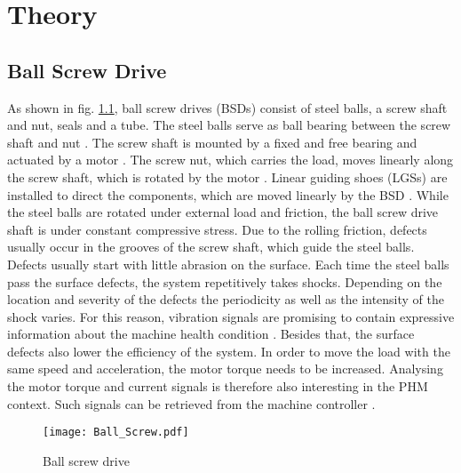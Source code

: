 \chapter{Theory}\label{chapter:theory}

\section{Ball Screw Drive}
As shown in fig. \ref{fig:Ball_Screw}, ball screw drives (BSDs) consist of steel balls, a screw shaft and nut, seals and a tube. The steel balls serve as ball bearing between the screw shaft and nut \cite{Lee2015}. The screw shaft is mounted by a fixed and free bearing and actuated by a motor \cite{DENG2020}. The screw nut, which carries the load, moves linearly along the screw shaft, which is rotated by the motor \cite{Lee2015}. Linear guiding shoes (LGSs) are installed to direct the components, which are moved linearly by the BSD \cite{DENG2020}. While the steel balls are rotated under external load and friction, the ball screw drive shaft is under constant compressive stress. Due to the rolling friction, defects usually occur in the grooves of the screw shaft, which guide the steel balls. Defects usually start with little abrasion on the surface. Each time the steel balls pass the surface defects, the system repetitively takes shocks. Depending on the location and severity of the defects the periodicity as well as the intensity of the shock varies. For this reason, vibration signals are promising to contain expressive information about the machine health condition \cite{Lee2015}. Besides that, the surface defects also lower the efficiency of the system. In order to move the load with the same speed and acceleration, the motor torque needs to be increased. Analysing the motor torque and current signals is therefore also interesting in the PHM context. Such signals can be retrieved from the machine controller \cite{AZAMFAR2020103932}.

\begin{figure}[H]
  \centering
  \texttt{[image: Ball\_Screw.pdf]}
  \caption {Ball screw drive \cite{DENG2020}} \label{fig:Ball_Screw}
\end{figure}

